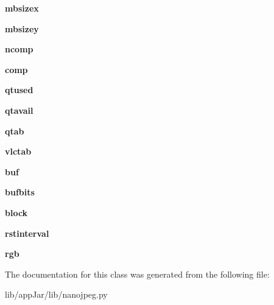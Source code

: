 \begin{DoxyCompactItemize}
{\bfseries mbsizex}
\item 
\mbox{\label{classlib_1_1nanojpeg_1_1nj__context__t_a13d3db2376d7dfdcab6d3649a5016be9}} 
{\bfseries mbsizey}
\item 
\mbox{\label{classlib_1_1nanojpeg_1_1nj__context__t_a63aa91b109f06a3d561aeb0c4407ce42}} 
{\bfseries ncomp}
\item 
\mbox{\label{classlib_1_1nanojpeg_1_1nj__context__t_aafedd251a4f0dfda39f0363be3e77434}} 
{\bfseries comp}
\item 
\mbox{\label{classlib_1_1nanojpeg_1_1nj__context__t_a9acda65d3eaaa1c6d37b2c55231f951a}} 
{\bfseries qtused}
\item 
\mbox{\label{classlib_1_1nanojpeg_1_1nj__context__t_a0ce510911afc6c65b6c1f56d5925acb0}} 
{\bfseries qtavail}
\item 
\mbox{\label{classlib_1_1nanojpeg_1_1nj__context__t_a9f0a5ab3d71c32a416bd039dfd3b605e}} 
{\bfseries qtab}
\item 
\mbox{\label{classlib_1_1nanojpeg_1_1nj__context__t_adfd160657b009ed825722fb4082a4ad5}} 
{\bfseries vlctab}
\item 
\mbox{\label{classlib_1_1nanojpeg_1_1nj__context__t_ac410051e176d737a2dead4d569cf65ca}} 
{\bfseries buf}
\item 
\mbox{\label{classlib_1_1nanojpeg_1_1nj__context__t_a36a5e8d8772b78da7aa56453e3c48ddb}} 
{\bfseries bufbits}
\item 
\mbox{\label{classlib_1_1nanojpeg_1_1nj__context__t_acaf1abd101b7de67ce3058ac17a9ad72}} 
{\bfseries block}
\item 
\mbox{\label{classlib_1_1nanojpeg_1_1nj__context__t_ae7d56b3d0ef025affd00098ca0e3d2ce}} 
{\bfseries rstinterval}
\item 
\mbox{\label{classlib_1_1nanojpeg_1_1nj__context__t_abb8e2a001e6df8e8dcb9ed55a4fa1479}} 
{\bfseries rgb}
\end{DoxyCompactItemize}


The documentation for this class was generated from the following file\+:\begin{DoxyCompactItemize}
\item 
lib/app\+Jar/lib/nanojpeg.\+py\end{DoxyCompactItemize}
